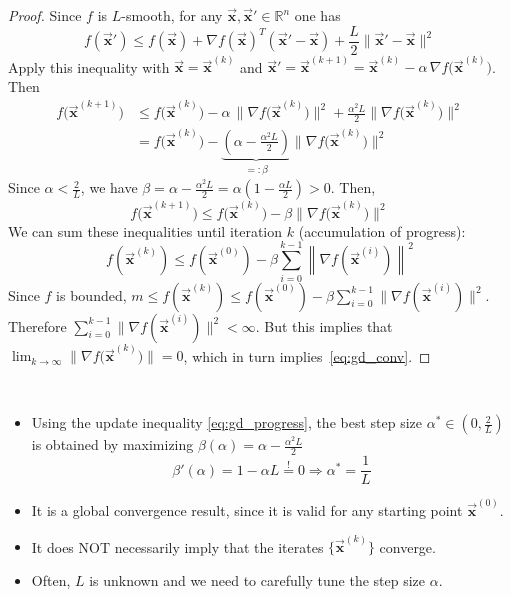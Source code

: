 \documentclass[9pt, headings=standardclasses, parskip=half]{scrartcl}
\renewcommand{\emph}[1]{\textcolor{mypurple}{#1}}
\newcommand{\vect}[1]{\vec{\boldsymbol{#1}}}
\begin{document}
\begin{proof}
Since \(f\) is \(L\)-smooth, for any \(\vect{x},\vect{x}'\in\mathbb{R}^{n}\) one has
\begin{equation}
\label{eq:L_smooth_gradient}
f(\vect{x}')\le f(\vect{x})+\nabla f(\vect{x})^{T}(\vect{x}'-\vect{x})+\frac{L}{2}\|\vect{x}'-\vect{x}\|^{2}
\end{equation}
Apply this inequality with \(\vect{x}=\vect{x}^{(k)}\) and \(\vect{x}'=\vect{x}^{(k+1)}=\vect{x}^{(k)}-\alpha\,\nabla f\bigl(\vect{x}^{(k)}\bigr)\). Then
\begin{align}
f\bigl(\vect{x}^{(k+1)}\bigr)
&\le f\bigl(\vect{x}^{(k)}\bigr)
-\alpha\,\|\nabla f\bigl(\vect{x}^{(k)}\bigr)\|^{2}
+\frac{\alpha^{2}L}{2}\|\nabla f\bigl(\vect{x}^{(k)}\bigr)\|^{2} \nonumber \\
&= f\bigl(\vect{x}^{(k)}\bigr)-\underbrace{\left(\alpha-\frac{\alpha^{2}L}{2}\right)}_{=: \beta}\|\nabla f\bigl(\vect{x}^{(k)}\bigr)\|^{2} \label{eq:gd_Lsmooth}
\end{align}
Since \(\alpha < \frac{2}{L}\), we have \(\beta = \alpha - \frac{\alpha^{2}L}{2} = \alpha\left(1-\frac{\alpha L}{2}\right) > 0\). Then,
\begin{equation}
\label{eq:gd_progress}
f\bigl(\vect{x}^{(k+1)}\bigr)\le f\bigl(\vect{x}^{(k)}\bigr)-\beta\|\nabla f\bigl(\vect{x}^{(k)}\bigr)\|^{2}
\end{equation}
We can sum these inequalities until iteration \(k\) (\emph{accumulation of progress}):
\[
f\left(\vect{x}^{(k)}\right) \le f\left(\vect{x}^{(0)}\right) - \beta\sum_{i=0}^{k-1}\left\|\nabla f\left(\vect{x}^{(i)}\right)\right\|^{2}
\]
Since \(f\) is bounded, 
\(
m \le f(\vect{x}^{(k)}) \le f(\vect{x}^{(0)}) - \beta\sum_{i=0}^{k-1}\|\nabla f(\vect{x}^{(i)})\|^{2}
\).
Therefore 
\(
\sum_{i=0}^{k-1}\|\nabla f(\vect{x}^{(i)})\|^{2} < \infty
\).
But this implies that
\(
\lim_{k\to\infty}\|\nabla f\bigl(\vect{x}^{(k)}\bigr)\|=0
\), which in turn implies~\eqref{eq:gd_conv}.
\end{proof}

\begin{remark}\
\begin{itemize}
\item Using the update inequality \eqref{eq:gd_progress}, the best step size \(\alpha^{*} \in \left(0,\frac{2}{L}\right)\) is obtained by maximizing
\(
\beta(\alpha)=\alpha-\frac{\alpha^{2}L}{2}
\)
\[
\beta'(\alpha) = 1 - \alpha L \overset{!}{=} 0 \Rightarrow \alpha^{*} = \frac{1}{L}
\]
\item It is a \emph{global} convergence result, since it is valid for any starting point \(\vect{x}^{(0)}\).
\item It does NOT necessarily imply that the iterates \(\{\vect{x}^{(k)}\}\) converge.
\item Often, \(L\) is unknown and we need to carefully tune the step size \(\alpha\).
\end{itemize}
\end{remark}
\end{document}

